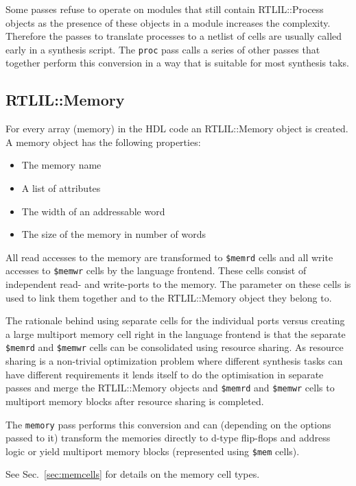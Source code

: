 Some passes refuse to operate on modules that still contain RTLIL::Process objects as the
presence of these objects in a module increases the complexity. Therefore the passes to translate
processes to a netlist of cells are usually called early in a synthesis script. The {\tt proc}
pass calls a series of other passes that together perform this conversion in a way that is suitable
for most synthesis taks.

\subsection{RTLIL::Memory}

For every array (memory) in the HDL code an RTLIL::Memory object is created. A
memory object has the following properties:

\begin{itemize}
\item The memory name
\item A list of attributes
\item The width of an addressable word
\item The size of the memory in number of words
\end{itemize}

All read accesses to the memory are transformed to {\tt \$memrd} cells and all write accesses to
{\tt \$memwr} cells by the language frontend. These cells consist of independent read- and write-ports
to the memory. The  parameter on these cells is used to link them together and to the
RTLIL::Memory object they belong to.

The rationale behind using separate cells for the individual ports versus
creating a large multiport memory cell right in the language frontend is that
the separate {\tt \$memrd} and {\tt \$memwr} cells can be consolidated using resource sharing.
As resource sharing is a non-trivial optimization problem where different synthesis tasks
can have different requirements it lends itself to do the optimisation in separate passes and merge
the RTLIL::Memory objects and {\tt \$memrd} and {\tt \$memwr} cells to multiport memory blocks after resource sharing is completed.

The {\tt memory} pass performs this conversion and can (depending on the options passed
to it) transform the memories directly to d-type flip-flops and address logic or yield
multiport memory blocks (represented using {\tt \$mem} cells).

See Sec.~\ref{sec:memcells} for details on the memory cell types.

